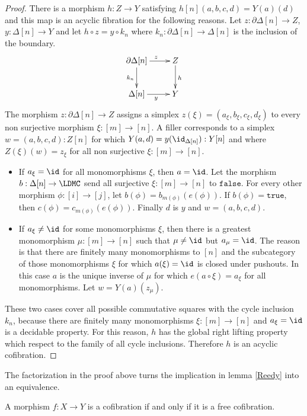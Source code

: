 \documentclass{tac}
\newcommand\of{:}
\newcommand\simplex\Delta
\newcommand\cycle{\partial\Delta}
\newcommand\true{\mathtt{true}}
\newcommand\false{\mathtt{false}}
\begin{document}
\begin{proof}
There is a morphism $h\of Z\to Y$ satisfying $h[n](a,b,c,d) = Y(a)(d)$ and this map is an acyclic fibration for the following reasons.
Let $z\of\cycle[n]\to Z$, $y\of\simplex[n]\to Y$ and let $h\circ z = y\circ k_n$ where $k_n\of\cycle[n]\to \simplex[n]$ is the inclusion of the boundary.
\[\xymatrix{
\cycle[n]\ar[d]_{k_n}\ar[r]^z & Z\ar[d]^h\\
\simplex[n]\ar[r]_{y} & Y
}\]
The morphism $z\of\cycle[n]\to Z$ assigns a simplex $z(\xi) = (a_\xi,b_\xi,c_\xi,d_\xi)$ to every non surjective morphism $\xi\of [m]\to[n]$.
A filler corresponds to a simplex $w=(a,b,c,d)\of Z[n]$ for which $Y(a,d) = y(\id_{\simplex[n]})\of Y[n]$ and where $Z(\xi)(w)=z_\xi$ for all non surjective $\xi\of [m]\to[n]$.
\begin{itemize}
\item If $a_\xi=\id$ for all monomorphisms $\xi$, then $a=\id$. Let the morphism $b\of \simplex[n]\to \LDMC$ send all surjective $\xi\of[m]\to[n]$ to $\false$. For every other morphism $\phi\of [i]\to [j]$, let $b(\phi) = b_{m(\phi)}(e(\phi))$. If $b(\phi)=\true$, then $c(\phi) = c_{m(\phi)}(e(\phi))$. Finally $d$ is $y$ and $w=(a,b,c,d)$.
\item If $a_\xi\neq \id$ for some monomorphisms $\xi$, then there is a greatest monomorphism $\mu\of [m]\to[n]$ such that $\mu\neq \id$ but $a_\mu=\id$. The reason is that there are finitely many monomorphisms to $[n]$ and the subcategory of those monomorphisms $\xi$ for which $a(\xi)=\id$ is closed under pushouts. In this case $a$ is the unique inverse of $\mu$ for which $e(a\circ \xi) = a_\xi$ for all monomorphisms. Let $w = Y(a)(z_\mu)$.
\end{itemize}

These two cases cover all possible commutative squares with the cycle inclusion $k_n$, because there are finitely many monomorphisms $\xi\of [m]\to [n]$ and $a_\xi = \id$ is a decidable property. For this reason, $h$ has the global right lifting property which respect to the family of all cycle inclusions. Therefore $h$ is an acyclic cofibration.
\end{proof} %

The factorization in the proof above turns the implication in lemma \ref{Reedy} into an equivalence.

\begin{proposition} A morphism $f\of X\to Y$ is a cofibration if and only if it is a free cofibration. \label{cofibration characterization} \end{proposition}
\end{document}
